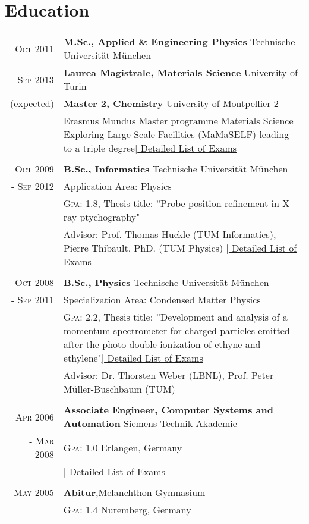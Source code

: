 \documentclass[a4paper,10pt]{article}
\begin{document}
\section{Education}
\begin{tabularx}{19cm}{rX}	

\textsc{Oct 2011}& \textbf{M.Sc., Applied \& Engineering Physics} \hfill{Technische Universität München}\\
\textsc{- Sep 2013} & \textbf{Laurea Magistrale, Materials Science} \hfill{University of Turin}\\
 (expected)&  \textbf{Master 2, Chemistry} \hfill{University of Montpellier 2}\\
 & \small{Erasmus Mundus Master programme Materials Science Exploring Large Scale Facilities (MaMaSELF) leading to a
triple degree}\hyperlink{MSC}{\hfill |\footnotesize{ Detailed List of Exams}}\\\\

\textsc{Oct 2009}& \textbf{B.Sc., Informatics} \hfill{Technische Universität München}\\
\textsc{- Sep 2012} & Application Area: Physics\\
 & \textsc{Gpa}: 1.8, \small{Thesis title: ”Probe position refinement in X-ray ptychography"}\\
& Advisor: Prof. Thomas Huckle (TUM Informatics), Pierre Thibault, PhD. (TUM Physics)
\hyperlink{grds_studies}{\hfill |\footnotesize{ Detailed List of Exams}}
\\\\

\textsc{Oct 2008}& \textbf{B.Sc.,  Physics} \hfill\normalsize{Technische Universität München}\\
 \textsc{- Sep 2011}& Specialization Area: Condensed Matter Physics \\
& \textsc{Gpa}: 2.2, \small{Thesis title: ”Development and analysis of a momentum spectrometer for charged particles emitted after the photo double ionization of ethyne and ethylene"}\hyperlink{physicsBSC}{\hfill |\footnotesize{ Detailed List of Exams}}\\
& Advisor: Dr. Thorsten Weber (LBNL),  Prof. Peter Müller-Buschbaum (TUM) \\\\


\textsc{Apr 2006}& \textbf{Associate Engineer, Computer Systems and Automation} \hfill  {Siemens Technik Akademie}\\
\textsc{- Mar 2008}& \textsc{Gpa}: 1.0  \hfill Erlangen, Germany\\
 &\hyperlink{grds_siemens}{\hfill| \footnotesize Detailed List of Exams}\\ \\

\textsc{May} 2005& \textbf{Abitur},\hfill  Melanchthon Gymnasium \\
&  \textsc{Gpa}: 1.4 \hfill Nuremberg, Germany

\end{tabularx}
\end{document}

